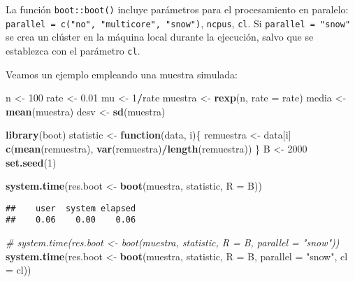\documentclass[
]{book}
\newenvironment{Shaded}{\begin{snugshade}}{\end{snugshade}}
\newcommand{\CommentTok}[1]{\textcolor[rgb]{0.56,0.35,0.01}{\textit{#1}}}
\newcommand{\ControlFlowTok}[1]{\textcolor[rgb]{0.13,0.29,0.53}{\textbf{#1}}}
\newcommand{\DataTypeTok}[1]{\textcolor[rgb]{0.13,0.29,0.53}{#1}}
\newcommand{\DecValTok}[1]{\textcolor[rgb]{0.00,0.00,0.81}{#1}}
\newcommand{\FloatTok}[1]{\textcolor[rgb]{0.00,0.00,0.81}{#1}}
\newcommand{\KeywordTok}[1]{\textcolor[rgb]{0.13,0.29,0.53}{\textbf{#1}}}
\newcommand{\NormalTok}[1]{#1}
\newcommand{\OperatorTok}[1]{\textcolor[rgb]{0.81,0.36,0.00}{\textbf{#1}}}
\newcommand{\StringTok}[1]{\textcolor[rgb]{0.31,0.60,0.02}{#1}}
\theoremstyle{break}
\theoremstyle{definition}
\theoremstyle{definition}
\theoremstyle{definition}
\theoremstyle{remark}
\begin{document}
La función \texttt{boot::boot()} incluye parámetros para el procesamiento en paralelo:
\texttt{parallel\ =\ c("no",\ "multicore",\ "snow")}, \texttt{ncpus}, \texttt{cl}.
Si \texttt{parallel\ =\ "snow"} se crea un clúster en la máquina local durante la ejecución,
salvo que se establezca con el parámetro \texttt{cl}.

Veamos un ejemplo empleando una muestra simulada:

\begin{Shaded}
\begin{Highlighting}[]
\NormalTok{n <-}\StringTok{ }\DecValTok{100}
\NormalTok{rate <-}\StringTok{ }\FloatTok{0.01}
\NormalTok{mu <-}\StringTok{ }\DecValTok{1}\OperatorTok{/}\NormalTok{rate}
\NormalTok{muestra <-}\StringTok{ }\KeywordTok{rexp}\NormalTok{(n, }\DataTypeTok{rate =}\NormalTok{ rate)}
\NormalTok{media <-}\StringTok{ }\KeywordTok{mean}\NormalTok{(muestra)}
\NormalTok{desv <-}\StringTok{ }\KeywordTok{sd}\NormalTok{(muestra)}

\KeywordTok{library}\NormalTok{(boot)}
\NormalTok{statistic <-}\StringTok{ }\ControlFlowTok{function}\NormalTok{(data, i)\{}
\NormalTok{  remuestra <-}\StringTok{ }\NormalTok{data[i]}
  \KeywordTok{c}\NormalTok{(}\KeywordTok{mean}\NormalTok{(remuestra), }\KeywordTok{var}\NormalTok{(remuestra)}\OperatorTok{/}\KeywordTok{length}\NormalTok{(remuestra))}
\NormalTok{\}}
\NormalTok{B <-}\StringTok{ }\DecValTok{2000}
\KeywordTok{set.seed}\NormalTok{(}\DecValTok{1}\NormalTok{)}

\KeywordTok{system.time}\NormalTok{(res.boot <-}\StringTok{ }\KeywordTok{boot}\NormalTok{(muestra, statistic, }\DataTypeTok{R =}\NormalTok{ B))}
\end{Highlighting}
\end{Shaded}

\begin{verbatim}
##    user  system elapsed 
##    0.06    0.00    0.06
\end{verbatim}

\begin{Shaded}
\begin{Highlighting}[]
\CommentTok{# system.time(res.boot <- boot(muestra, statistic, R = B, parallel = "snow"))}
\KeywordTok{system.time}\NormalTok{(res.boot <-}\StringTok{ }\KeywordTok{boot}\NormalTok{(muestra, statistic, }\DataTypeTok{R =}\NormalTok{ B, }\DataTypeTok{parallel =} \StringTok{"snow"}\NormalTok{, }\DataTypeTok{cl =}\NormalTok{ cl))}
\end{Highlighting}
\end{Shaded}
\end{document}

